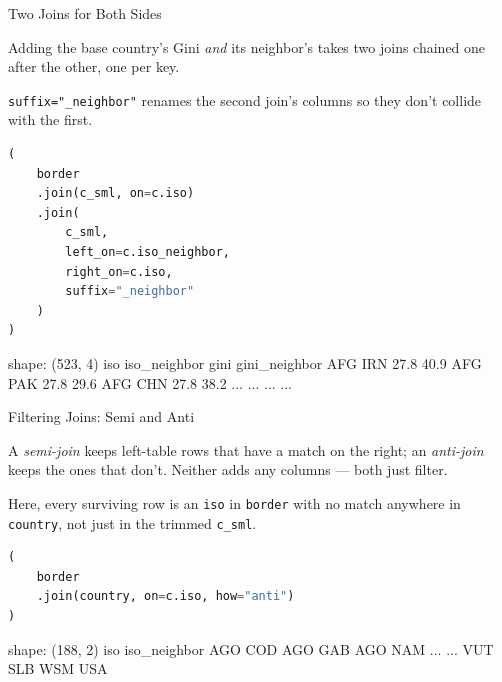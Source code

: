 \documentclass[8pt,aspectratio=169]{beamer}
\begin{document}
\begin{frame}[fragile]{Two Joins for Both Sides}
\begin{splitcode}{%

Adding the base country's Gini \textit{and} its neighbor's takes two joins chained one after the other, one per key.

\texttt{suffix="\_neighbor"} renames the second join's columns so they don't collide with the first.

}
\begin{lstlisting}[language=Python]
(
    border
    .join(c_sml, on=c.iso)
    .join(
        c_sml,
        left_on=c.iso_neighbor,
        right_on=c.iso,
        suffix="_neighbor"
    )
)
\end{lstlisting}
\begin{codeoutput}
shape: (523, 4)
iso  iso_neighbor  gini  gini_neighbor
AFG  IRN           27.8  40.9
AFG  PAK           27.8  29.6
AFG  CHN           27.8  38.2
...  ...           ...   ...
\end{codeoutput}
\end{splitcode}
\end{frame}

\begin{frame}[fragile]{Filtering Joins: Semi and Anti}
\begin{splitcode}{%

A \textit{semi-join} keeps left-table rows that have a match on the right; an \textit{anti-join} keeps the ones that don't. Neither adds any columns --- both just filter.

Here, every surviving row is an \texttt{iso} in \texttt{border} with no match anywhere in \texttt{country}, not just in the trimmed \texttt{c\_sml}.

}
\begin{lstlisting}[language=Python]
(
    border
    .join(country, on=c.iso, how="anti")
)
\end{lstlisting}
\begin{codeoutput}
shape: (188, 2)
iso  iso_neighbor
AGO  COD
AGO  GAB
AGO  NAM
...  ...
VUT  SLB
WSM  USA
\end{codeoutput}
\end{splitcode}
\end{frame}
\end{document}
